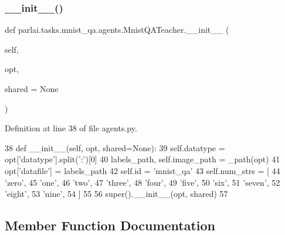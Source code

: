 \subsubsection{\texorpdfstring{\+\_\+\+\_\+init\+\_\+\+\_\+()}{\_\_init\_\_()}}
{\footnotesize\ttfamily def parlai.\+tasks.\+mnist\+\_\+qa.\+agents.\+Mnist\+Q\+A\+Teacher.\+\_\+\+\_\+init\+\_\+\+\_\+ (\begin{DoxyParamCaption}\item[{}]{self,  }\item[{}]{opt,  }\item[{}]{shared = {\ttfamily None} }\end{DoxyParamCaption})}



Definition at line 38 of file agents.\+py.


\begin{DoxyCode}
38     \textcolor{keyword}{def }\_\_init\_\_(self, opt, shared=None):
39         self.datatype = opt[\textcolor{stringliteral}{'datatype'}].split(\textcolor{stringliteral}{':'})[0]
40         labels\_path, self.image\_path = \_path(opt)
41         opt[\textcolor{stringliteral}{'datafile'}] = labels\_path
42         self.id = \textcolor{stringliteral}{'mnist\_qa'}
43         self.num\_strs = [
44             \textcolor{stringliteral}{'zero'},
45             \textcolor{stringliteral}{'one'},
46             \textcolor{stringliteral}{'two'},
47             \textcolor{stringliteral}{'three'},
48             \textcolor{stringliteral}{'four'},
49             \textcolor{stringliteral}{'five'},
50             \textcolor{stringliteral}{'six'},
51             \textcolor{stringliteral}{'seven'},
52             \textcolor{stringliteral}{'eight'},
53             \textcolor{stringliteral}{'nine'},
54         ]
55 
56         super().\_\_init\_\_(opt, shared)
57 
\end{DoxyCode}


\subsection{Member Function Documentation}
\mbox{\label{classparlai_1_1tasks_1_1mnist__qa_1_1agents_1_1MnistQATeacher_ab00955aa62e9056a3b3a3f712a07fa93}} 
